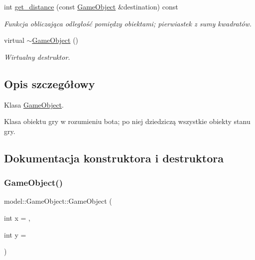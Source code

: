 \begin{DoxyCompactItemize}
\mbox{\label{classmodel_1_1GameObject_a294f5a3a05529858758edba9f9f02ee3}} 
int \hyperlink{classmodel_1_1GameObject_a294f5a3a05529858758edba9f9f02ee3}{get\+\_\+distance} (const \hyperlink{classmodel_1_1GameObject}{Game\+Object} \&destination) const
\begin{DoxyCompactList}\small\item\em Funkcja obliczająca odległość pomiędzy obiektami; pierwiastek z sumy kwadratów. \end{DoxyCompactList}\item 
\mbox{\label{classmodel_1_1GameObject_acfd1cc777708e9db44f59716db36c486}} 
virtual \hyperlink{classmodel_1_1GameObject_acfd1cc777708e9db44f59716db36c486}{$\sim$\+Game\+Object} ()
\begin{DoxyCompactList}\small\item\em Wirtualny destruktor. \end{DoxyCompactList}\end{DoxyCompactItemize}


\subsection{Opis szczegółowy}
Klasa \hyperlink{classmodel_1_1GameObject}{Game\+Object}. 

Klasa obiektu gry w rozumieniu bota; po niej dziedziczą wszystkie obiekty stanu gry. 

\subsection{Dokumentacja konstruktora i destruktora}
\mbox{\label{classmodel_1_1GameObject_aec3d26647ae22d325282e07b4391de0a}} 
\subsubsection{\texorpdfstring{Game\+Object()}{GameObject()}\hspace{0.1cm}{\footnotesize\ttfamily [1/2]}}
{\footnotesize\ttfamily model\+::\+Game\+Object\+::\+Game\+Object (\begin{DoxyParamCaption}\item[{int}]{x = {},  }\item[{int}]{y = {} }\end{DoxyParamCaption})\hspace{0.3cm}{\ttfamily [inline]}}



